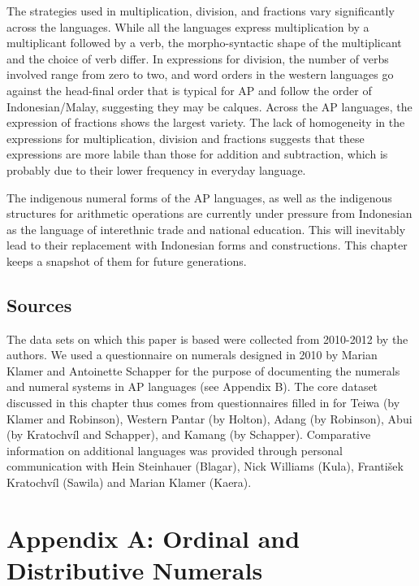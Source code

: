 The strategies used in multiplication, division, and fractions vary significantly across the languages. While all the languages express multiplication by a multiplicant followed by a verb, the morpho-syntactic shape of the multiplicant and the choice of verb differ. In expressions for division, the number of verbs involved range from zero to two, and word orders in the western languages go against the head-final order that is typical for AP and follow the order of Indonesian/Malay, suggesting they may be calques. Across the AP languages, the expression of fractions shows the largest variety. The lack of homogeneity in the expressions for multiplication, division and fractions suggests that these expressions are more labile than those for addition and subtraction, which is probably due to their lower frequency in everyday language.

The indigenous numeral forms of the AP languages, as well as the indigenous structures for arithmetic operations are currently under pressure from Indonesian as the language of interethnic trade and national education. This will inevitably lead to their replacement with Indonesian forms and constructions. This chapter keeps a snapshot of them for future generations.

\subsection{Sources}
The data sets on which this paper is based were collected from 2010-2012 by the authors. We used a questionnaire on numerals designed in 2010 by Marian Klamer and Antoinette Schapper for the purpose of documenting the numerals and numeral systems in AP languages (see Appendix B). The core dataset discussed in this chapter thus comes from questionnaires filled in for Teiwa (by Klamer and Robinson), Western Pantar (by Holton), Adang (by Robinson), Abui (by Kratochv\'il and Schapper), and Kamang (by Schapper). Comparative information on additional languages was provided through personal communication with Hein Steinhauer (Blagar), Nick Williams (Kula), Franti{\v{s}}ek Kratochv\'il (Sawila) and Marian Klamer (Kaera).


\section*{Appendix A: Ordinal and Distributive Numerals}

